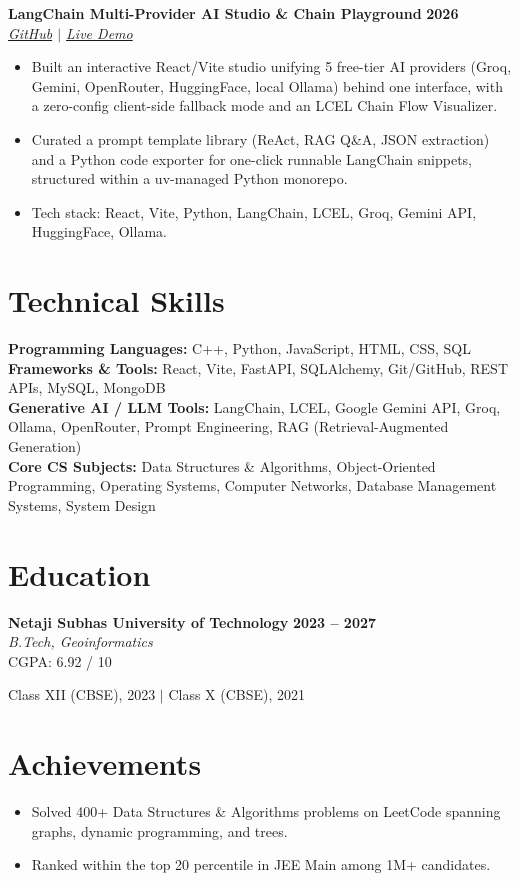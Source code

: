 \documentclass[10pt,letterpaper]{article}
\newcommand{\entry}[4]{%
    \textbf{#1} \hfill \textbf{#3}\\
    \textit{#2} \hfill \textit{#4}\\[0pt]
}
\begin{document}
\entry{LangChain Multi-Provider AI Studio \& Chain Playground}{\href{https://github.com/i-abhishek-04/Langchain-enterprise-rag-platform.git}{GitHub} $\vert$ \href{https://langchain-enterprise-ai-platform.vercel.app}{Live Demo}}{2026}{}
\vspace{-4pt}
\begin{itemize}
    \item Built an interactive React/Vite studio unifying 5 free-tier AI providers (Groq, Gemini, OpenRouter, HuggingFace, local Ollama) behind one interface, with a zero-config client-side fallback mode and an LCEL Chain Flow Visualizer.
    \item Curated a prompt template library (ReAct, RAG Q\&A, JSON extraction) and a Python code exporter for one-click runnable LangChain snippets, structured within a uv-managed Python monorepo.
    \item Tech stack: React, Vite, Python, LangChain, LCEL, Groq, Gemini API, HuggingFace, Ollama.
\end{itemize}

\section*{Technical Skills}
\textbf{Programming Languages:} C++, Python, JavaScript, HTML, CSS, SQL\\
\textbf{Frameworks \& Tools:} React, Vite, FastAPI, SQLAlchemy, Git/GitHub, REST APIs, MySQL, MongoDB\\
\textbf{Generative AI / LLM Tools:} LangChain, LCEL, Google Gemini API, Groq, Ollama, OpenRouter, Prompt Engineering, RAG (Retrieval-Augmented Generation)\\
\textbf{Core CS Subjects:} Data Structures \& Algorithms, Object-Oriented Programming, Operating Systems, Computer Networks, Database Management Systems, System Design

\section*{Education}

\entry{Netaji Subhas University of Technology}{B.Tech, Geoinformatics}{2023 -- 2027}{}
CGPA: 6.92 / 10

\vspace{3pt}
{\small Class XII (CBSE), 2023 \quad $\vert$ \quad Class X (CBSE), 2021}

\section*{Achievements}
\begin{itemize}
    \item Solved 400+ Data Structures \& Algorithms problems on LeetCode spanning graphs, dynamic programming, and trees.
    \item Ranked within the top 20 percentile in JEE Main among 1M+ candidates.
\end{itemize}
\end{document}
